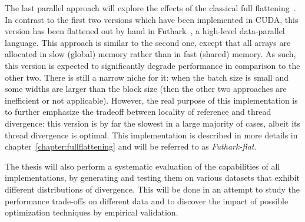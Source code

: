 The last parallel approach will explore the effects of the classical full flattening~\cite{blelloch1994implementation}. In contrast to the first two versions which have been implemented in CUDA, this version has been flattened out by hand in Futhark~\cite{henriksen2017futhark}, a high-level data-parallel language.  This approach is similar to the second one, except that all arrays are allocated in slow (global) memory rather than in fast (shared) memory.   As such, this version is expected to significantly degrade performance in comparison to the other two. There is still a narrow niche for it: when the batch size is small and some widths are larger than the block size (then the other two approaches are inefficient or not applicable). However, the real purpose of this implementation is to further emphasize the tradeoff between locality of reference and thread divergence: this version is by far the slowest in a large majority of cases, albeit its thread divergence is optimal. This implementation is described in more details in chapter~\ref{chapter:fullflattening} and will be referred to as \textit{Futhark-flat}.



The thesis will also perform a systematic evaluation of the capabilities of all implementations, by generating and testing them on various datasets that exhibit different distributions of divergence. This will be done in an attempt to study the performance trade-offs on different data and to discover the impact of possible optimization techniques by empirical validation.  


